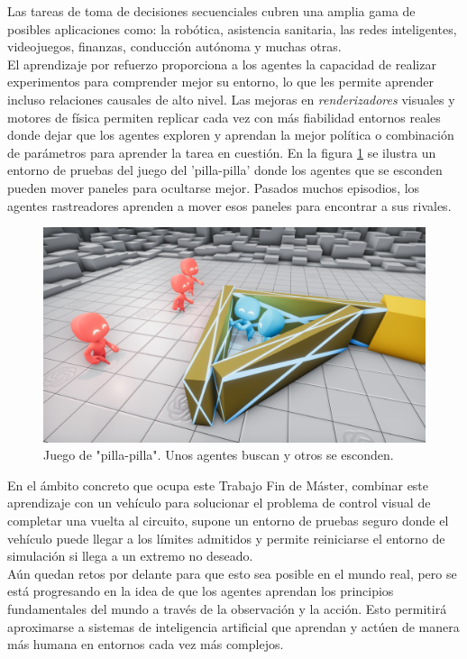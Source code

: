 Las tareas de toma de decisiones secuenciales cubren una amplia gama de posibles aplicaciones como: la robótica, asistencia sanitaria, las redes inteligentes, videojuegos, finanzas, conducción autónoma y muchas otras.\\

El aprendizaje por refuerzo proporciona a los agentes la capacidad de realizar experimentos para comprender mejor su entorno, lo que les permite aprender incluso relaciones causales de alto nivel. Las mejoras en \textit{renderizadores} visuales y motores de física permiten replicar cada vez con más fiabilidad entornos reales donde dejar que los agentes exploren y aprendan la mejor política o combinación de parámetros para aprender la tarea en cuestión. En la figura \ref{fig:dqn_hide-seek} se ilustra un entorno de pruebas del juego del 'pilla-pilla' donde los agentes que se esconden pueden mover paneles para ocultarse mejor. Pasados muchos episodios, los agentes rastreadores aprenden a mover esos paneles para encontrar a sus rivales.\\

\begin{figure}[!ht]
    \centering \includegraphics[width=0.6\columnwidth]{./figures/chapter_2/drl_hide_seek.png}
    \caption{Juego de "pilla-pilla". Unos agentes buscan y otros se esconden.}\label{fig:dqn_hide-seek}
\end{figure}

En el ámbito concreto que ocupa este Trabajo Fin de Máster, combinar este aprendizaje con un vehículo para solucionar el problema de control visual de completar una vuelta al circuito, supone un entorno de pruebas seguro donde el vehículo puede llegar a los límites admitidos y permite reiniciarse el entorno de simulación si llega a un extremo no deseado.\\

Aún quedan retos por delante para que esto sea posible en el mundo real, pero se está progresando en la idea de que los agentes aprendan los principios fundamentales del mundo a través de la observación y la acción. Esto permitirá aproximarse a sistemas de inteligencia artificial que aprendan y actúen de manera más humana en entornos cada vez más complejos.


